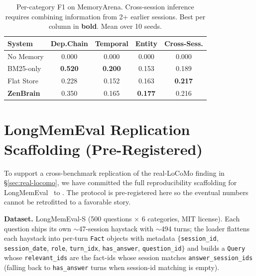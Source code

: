 \documentclass{article}
\begin{document}
\begin{table}[h]
    \caption{Per-category F1 on MemoryArena. Cross-session inference
    requires combining information from 2+ earlier sessions.
    Best per column in \textbf{bold}. Mean over 10 seeds.}
    \label{tab:arena-categories}
    \centering
    \small
    \begin{tabular}{lcccc}
        \toprule
        System & Dep.Chain & Temporal & Entity & Cross-Sess. \\
        \midrule
        No Memory & 0.000 & 0.000 & 0.000 & 0.000 \\
        BM25-only & \textbf{0.520} & \textbf{0.200} & 0.153 & 0.189 \\
        Flat Store & 0.228 & 0.152 & 0.163 & \textbf{0.217} \\
        \textbf{ZenBrain} & 0.350 & 0.165 & \textbf{0.177} & 0.216 \\
        \bottomrule
    \end{tabular}
\end{table}

\section{LongMemEval Replication Scaffolding (Pre-Registered)}
\label{app:g5-longmemeval-scaffold}

To support a cross-benchmark replication of the real-LoCoMo finding in
\S\ref{sec:real-locomo}, we have committed the full reproducibility
scaffolding for LongMemEval~\citep{wu2024longmemeval} to
. The protocol is
pre-registered here so the eventual numbers cannot be retrofitted to
a favorable story.

\textbf{Dataset.} LongMemEval-S (500 questions $\times$ 6 categories,
MIT license). Each question ships its own $\sim$47-session haystack with
$\sim$494 turns; the loader
 flattens each
haystack into per-turn \texttt{Fact} objects with metadata
$\{$\texttt{session\_id}, \texttt{session\_date}, \texttt{role},
\texttt{turn\_idx}, \texttt{has\_answer}, \texttt{question\_id}$\}$ and
builds a \texttt{Query} whose \texttt{relevant\_ids} are the fact-ids
whose session matches \texttt{answer\_session\_ids} (falling back to
\texttt{has\_answer} turns when session-id matching is empty).
\end{document}
